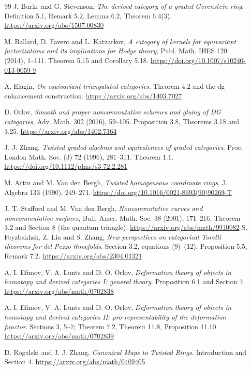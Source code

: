\documentclass[a4paper,11pt]{ltjsarticle}
\theoremstyle{definition}
\begin{document}
\begin{thebibliography}{99}
J. Burke and G. Stevenson,
\emph{The derived category of a graded Gorenstein ring}.
Definition 5.1, Remark 5.2, Lemma 6.2, Theorem 6.4(3).
\url{https://arxiv.org/abs/1507.00830}

M. Ballard, D. Favero and L. Katzarkov,
\emph{A category of kernels for equivariant factorizations and its implications for Hodge theory},
Publ. Math. IHES 120 (2014), 1--111.
Theorem 5.15 and Corollary 5.18.
\url{https://doi.org/10.1007/s10240-013-0059-9}

A. Elagin,
\emph{On equivariant triangulated categories}.
Theorem 4.2 and the dg enhancement construction.
\url{https://arxiv.org/abs/1403.7027}

D. Orlov,
\emph{Smooth and proper noncommutative schemes and gluing of DG categories},
Adv. Math. 302 (2016), 59--105.
Proposition 3.8, Theorems 3.18 and 3.25.
\url{https://arxiv.org/abs/1402.7364}

J. J. Zhang,
\emph{Twisted graded algebras and equivalences of graded categories},
Proc. London Math. Soc. (3) 72 (1996), 281--311.
Theorem 1.1.
\url{https://doi.org/10.1112/plms/s3-72.2.281}

M. Artin and M. Van den Bergh,
\emph{Twisted homogeneous coordinate rings},
J. Algebra 133 (1990), 249--271.
\url{https://doi.org/10.1016/0021-8693(90)90269-T}

J. T. Stafford and M. Van den Bergh,
\emph{Noncommutative curves and noncommutative surfaces},
Bull. Amer. Math. Soc. 38 (2001), 171--216.
Theorem 3.2 and Section 8 (the quantum triangle).
\url{https://arxiv.org/abs/math/9910082}
S. Feyzbakhsh, Z. Liu and S. Zhang,
\emph{New perspectives on categorical Torelli theorems for del Pezzo threefolds}.
Section 3.2, equations (9)--(12), Proposition 5.5, Remark 7.2.
\url{https://arxiv.org/abs/2304.01321}

A. I. Efimov, V. A. Lunts and D. O. Orlov,
\emph{Deformation theory of objects in homotopy and derived categories I: general theory}.
Proposition 6.1 and Section 7.
\url{https://arxiv.org/abs/math/0702838}

A. I. Efimov, V. A. Lunts and D. O. Orlov,
\emph{Deformation theory of objects in homotopy and derived categories II:
pro-representability of the deformation functor}.
Sections 3, 5--7; Theorem 7.2, Theorem 11.8, Proposition 11.10.
\url{https://arxiv.org/abs/math/0702839}

D. Rogalski and J. J. Zhang,
\emph{Canonical Maps to Twisted Rings}.
Introduction and Section 4.
\url{https://arxiv.org/abs/math/0409405}


\end{thebibliography}
\end{document}
